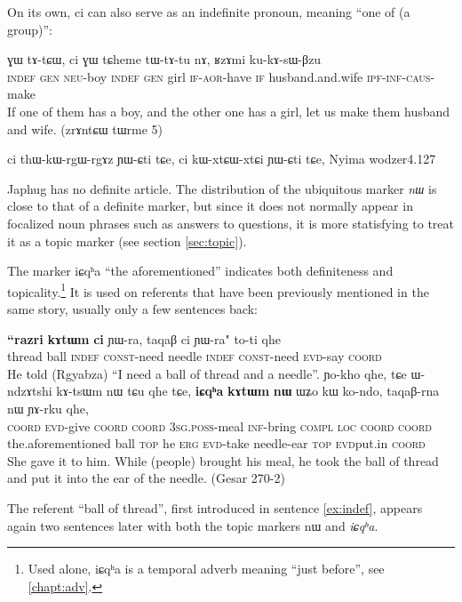 \documentclass[oldfontcommands,oneside,a4paper,11pt]{memoir}
\newcommand{\ipa}[1]{{\phon #1}} %
\newcommand{\aor}{\textsc{aor}}
\newcommand{\caus}{\textsc{caus}}
\newcommand{\coord}{\textsc{coord}}
\newcommand{\const}{\textsc{const}}
\newcommand{\erg}{\textsc{erg}}
\newcommand{\evd}{\textsc{evd}}
\newcommand{\gen}{\textsc{gen}}
\newcommand{\inftv}{\textsc{inf}}
\newcommand{\ipf}{\textsc{ipf}}
\newcommand{\loc}{\textsc{loc}}
\newcommand{\neu}{\textsc{neu}}
\newcommand{\poss}{\textsc{poss}}
\newcommand{\sg}{\textsc{sg}}
\newcommand{\topic}{\textsc{top}}
\begin{document}
On its own, \ipa{ci} can also serve as an indefinite pronoun, meaning ``one of (a group)'':
  \begin{exe}
\ex
\gll \ipa{ci} 	\ipa{ɣɯ} 	\ipa{tɤ-tɕɯ,} 	\ipa{ci} 	\ipa{ɣɯ} 	\ipa{tɕheme} 	\ipa{tɯ-tɤ-tu} 	\ipa{nɤ,} 	\ipa{ʁzɤmi} 	\ipa{ku-kɤ-sɯ-βzu} \\
\textsc{indef} \gen{} \neu{}-boy \textsc{indef} \gen{} girl \textsc{if}-\aor{}-have \textsc{if} husband.and.wife \ipf{}-\inftv{}-\caus{}-make \\
\glt If one of them has a boy, and the other one has a girl, let us make them husband and wife. (zrɤntɕɯ tɯrme 5)
\end{exe}


ci thɯ-kɯ-rgɯ-rgɤz ɲɯ-ɕti tɕe, ci kɯ-xtɕɯ-xtɕi ɲɯ-ɕti tɕe,
Nyima wodzer4.127

Japhug has no definite article. The distribution of the ubiquitous marker \textit{nɯ} is close to that of a definite marker, but since it does not normally appear in focalized noun phrases such as answers to questions,  it is more statisfying to treat it as a topic marker (see section \ref{sec:topic}).

The marker  \ipa{iɕqʰa} ``the aforementioned'' indicates both definiteness and topicality.\footnote{Used alone, \ipa{iɕqʰa} is a temporal adverb meaning ``just before'', see \ref{chapt:adv}.} It is used on referents that have been previously mentioned in the same story, usually only a few sentences back:
  \begin{exe}
\ex \label{ex:indef}
\gll \textbf{\ipa{``razri}} 	\textbf{\ipa{kɤtɯm}} 	\textbf{\ipa{ci}} 	\ipa{ɲɯ-ra,} 	\ipa{taqaβ} 	\ipa{ci} 	\ipa{ɲɯ-ra"} \ipa{to-ti} \ipa{qhe}   \\
 thread ball \textsc{indef} \const{}-need needle \textsc{indef} \const{}-need \evd{}-say \coord{}  \\
\glt He told (Rgyabza) ``I need a ball of thread and a needle''.
\ex \label{ex:icqha}
\gll \ipa{tɕendɤre} 	\ipa{ɲo-kho} 	\ipa{qhe,} 	\ipa{tɕe} 	\ipa{ɯ-ndzɤtshi} 	\ipa{kɤ-tsɯm} 	\ipa{nɯ} 	\ipa{tɕu} 	\ipa{qhe} 	\ipa{tɕe,} \textbf{\ipa{iɕqʰa}} 	\textbf{\ipa{kɤtɯm}} 	\textbf{\ipa{nɯ} }	\ipa{ɯʑo} 	\ipa{kɯ} 	\ipa{ko-ndo,} 	\ipa{taqaβ-rna} 	\ipa{nɯ} 	\ipa{ɲɤ-rku} \ipa{qhe,}  \\
 \coord{} \evd{}-give \coord{} \coord{} 3\sg{}.\poss{}-meal \inftv{}-bring \textsc{compl}  \loc{} \coord{} \coord{} the.aforementioned ball \topic{} he \erg{} \evd{}-take needle-ear \topic{} \evd{}put.in \coord{} \\
\glt She gave it to him. While (people) brought his meal, he took the ball of thread and put it into the ear of the needle. (Gesar 270-2)
\end{exe}
The referent ``ball of thread'', first introduced in sentence \ref{ex:indef}, appears again two sentences later with both the topic markers \ipa{nɯ} and \textit{iɕqʰa}. 
\end{document}

